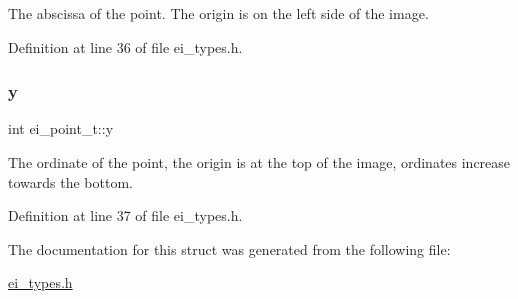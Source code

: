 The abscissa of the point. The origin is on the left side of the image. 



Definition at line 36 of file ei\+\_\+types.\+h.

\mbox{\label{structei__point__t_a0c0f1bfa95c372595c52522877f556a0}} 
\subsubsection{\texorpdfstring{y}{y}}
{\footnotesize\ttfamily int ei\+\_\+point\+\_\+t\+::y}



The ordinate of the point, the origin is at the top of the image, ordinates increase towards the bottom. 



Definition at line 37 of file ei\+\_\+types.\+h.



The documentation for this struct was generated from the following file\+:\begin{DoxyCompactItemize}
\item 
\hyperlink{ei__types_8h}{ei\+\_\+types.\+h}\end{DoxyCompactItemize}
